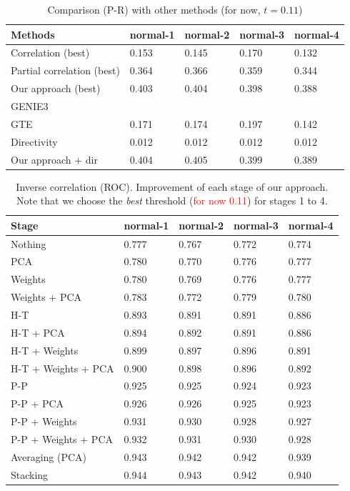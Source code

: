 \documentclass[wcp]{jmlr}
\begin{document}
\begin{table}[htb]
\centering
\caption{Comparison (P-R) with other methods (for now, $t = 0.11$)}
\begin{tabular}{*{5}{l}}
\toprule
Methods             & normal-1 & normal-2 & normal-3 & normal-4 \\
\midrule
Correlation (best)         & 0.153 & 0.145 & 0.170 & 0.132 \\
Partial correlation (best) & 0.364 & 0.366 & 0.359 & 0.344 \\
Our approach (best)        & 0.403 & 0.404 & 0.398 & 0.388 \\
GENIE3                     & & & & \\
GTE                        & 0.171 & 0.174 & 0.197 & 0.142 \\
Directivity                & 0.012 & 0.012 & 0.012 & 0.012 \\
Our approach + dir         & 0.404 & 0.405 & 0.399 & 0.389 \\
\bottomrule
\end{tabular}
\end{table}

\begin{table}[htb]
\centering
\caption{Inverse correlation (ROC). Improvement of each stage of our approach. Note that we choose the
         \textit{best} threshold (\textcolor{red}{for now 0.11}) for stages 1 to 4.}
\begin{tabular}{*{5}{l}}
\toprule
Stage               & normal-1 & normal-2 & normal-3 & normal-4 \\
\midrule
Nothing             & 0.777 & 0.767 & 0.772 & 0.774 \\
PCA                 & 0.780 & 0.770 & 0.776 & 0.777 \\
Weights             & 0.780 & 0.769 & 0.776 & 0.777 \\
Weights + PCA       & 0.783 & 0.772 & 0.779 & 0.780 \\
H-T                 & 0.893 & 0.891 & 0.891 & 0.886 \\
H-T + PCA           & 0.894 & 0.892 & 0.891 & 0.886 \\
H-T + Weights       & 0.899 & 0.897 & 0.896 & 0.891 \\
H-T + Weights + PCA & 0.900 & 0.898 & 0.896 & 0.892 \\
P-P                 & 0.925 & 0.925 & 0.924 & 0.923 \\
P-P + PCA           & 0.926 & 0.926 & 0.925 & 0.923 \\
P-P + Weights       & 0.931 & 0.930 & 0.928 & 0.927 \\
P-P + Weights + PCA & 0.932 & 0.931 & 0.930 & 0.928 \\
Averaging (PCA)     & 0.943 & 0.942 & 0.942 & 0.939 \\
Stacking            & 0.944 & 0.943 & 0.942 & 0.940 \\
\bottomrule
\end{tabular}
\end{table}
\end{document}
